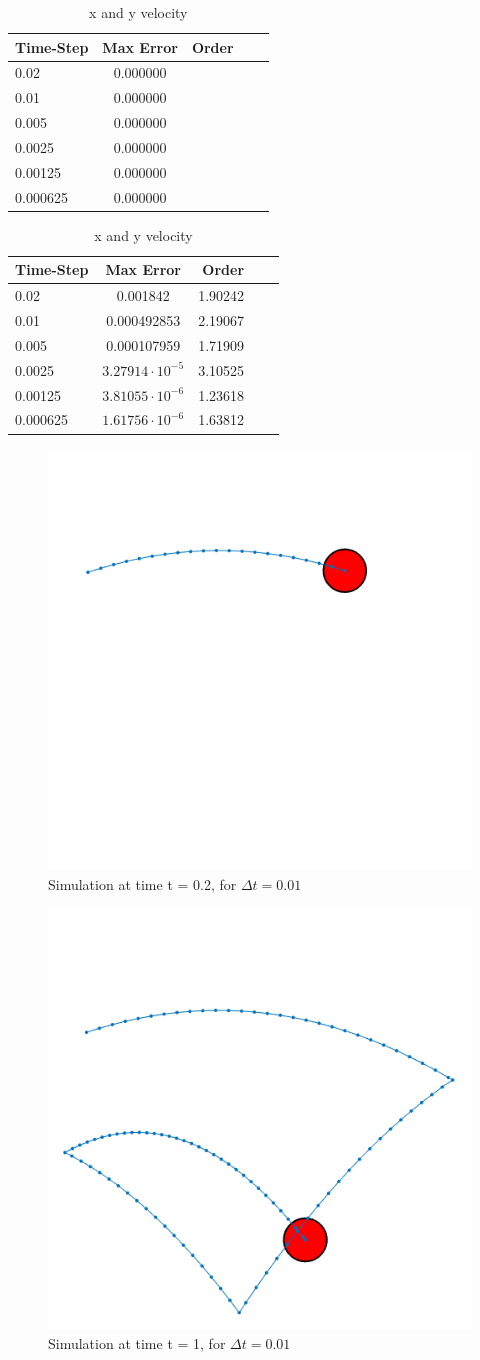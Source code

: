 \documentclass[12pt]{article}
\begin{document}
\begin{table}[bht]
\begin{center}
\begin{tabular}{|l|c|r|c|c|}
\hline
Time-Step& Max Error & Order \\ \hline
0.02& 0.000000&  \\ \hline
0.01& 0.000000&  \\ \hline
0.005& 0.000000&  \\ \hline
0.0025& 0.000000&  \\ \hline
0.00125& 0.000000&  \\ \hline
0.000625& 0.000000&  \\ \hline

\end{tabular}
\quad
\begin{tabular}{|l|c|r|c|c|}
\hline
Time-Step& Max Error & Order \\ \hline
0.02& 0.001842& 1.90242 \\ \hline
0.01& 0.000492853& 2.19067 \\ \hline
0.005& 0.000107959&  1.71909\\ \hline
0.0025& $3.27914\cdot10^{-5}$& 3.10525 \\ \hline
0.00125& $3.81055\cdot10^{-6}$& 1.23618 \\ \hline
0.000625&$1.61756\cdot10^{-6}$& 1.63812 \\ \hline

\end{tabular}
\caption{x and y velocity}
\end{center}
\end{table}


\begin{figure}[h]
\begin{center}
\includegraphics[width=.3\textwidth]{02}
\end{center}
\caption{Simulation at time t = 0.2, for $\Delta t = 0.01$} \label{fig::MyFigure}
\end{figure}

\begin{figure}[h]
\begin{center}
\includegraphics[width=.3\textwidth]{1}
\end{center}
\caption{Simulation at time t = 1, for $\Delta t = 0.01$} \label{fig::MyFigure}
\end{figure}
\end{document}
